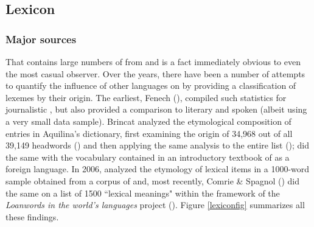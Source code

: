 \documentclass[output=paper]{langsci/langscibook}
\begin{document}


\subsection{Lexicon} \label{mtlexicon} %
\subsubsection{Major sources}
That  contains large numbers of  from  and  is a fact immediately obvious to even the most casual observer. Over the years, there have been a number of attempts to quantify the influence of other languages on  by providing a classification of lexemes by their origin. The earliest, Fenech (\citeyear[216--217]{fenech1978}), compiled such statistics for journalistic , but also provided a comparison to literary and spoken  (albeit using a very small data sample). Brincat analyzed the etymological composition of entries in Aquilina's dictionary, first examining the origin of 34,968 out of all 39,149 headwords (\citealt[115]{brincat1996}) and then applying the same analysis to the entire list (\citealt[407]{brincat2011});  \cite{mifsudborg1997} did the same with the vocabulary contained in an introductory textbook of  as a foreign language. In 2006, \cite{bovingdondalli2006} analyzed the etymology of lexical items in a 1000-word sample obtained from a corpus of  and, most recently, Comrie \& Spagnol (\citeyear[318]{comriespagnol2016}) did the same on a list of 1500 ``lexical meanings" within the framework of the \textit{Loanwords in the world’s languages} project (\citealt{HaspelmathTadmor2009}). Figure \ref{lexiconfig} summarizes all these findings.
\end{document}
